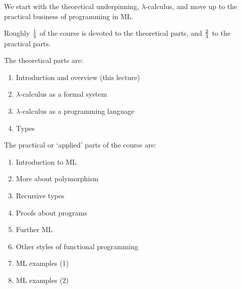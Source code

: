 \begin{slide*}


\vspace*{0.5cm}

We start with the theoretical underpinning, $\lambda$-calculus, and move up to
the practical business of programming in ML.

Roughly $1 \over 3$ of the course is devoted to the theoretical parts, and $2
\over 3$ to the practical parts.

The theoretical parts are:

\begin{enumerate}

\item Introduction and overview (this lecture)

\item $\lambda$-calculus as a formal system

\item $\lambda$-calculus as a programming language

\item Types

\end{enumerate}

\end{slide*}


\begin{slide*}


\vspace*{0.5cm}

The practical or `applied' parts of the course are:

\begin{enumerate}

\item Introduction to ML

\item More about polymorphism

\item Recursive types

\item Proofs about programs

\item Further ML

\item Other styles of functional programming

\item ML examples (1)

\item ML examples (2)

\end{enumerate}

\end{slide*}


